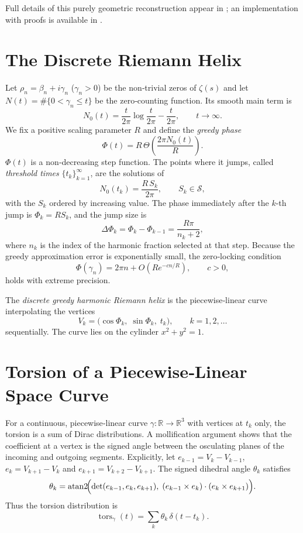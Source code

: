 \documentclass[11pt,a4paper]{article}
\newcommand{\R}{\mathbb{R}}
\newcommand{\tors}{\operatorname{tors}}
\newcommand{\atan}{\operatorname{atan2}}
\begin{document}
Full details of this purely geometric reconstruction appear in
\cite{geere2020}; an implementation with proofs is available in
\cite{geere2025sine}.

\section{The Discrete Riemann Helix}

Let \(\rho_n = \beta_n + i\gamma_n\) (\(\gamma_n>0\)) be the non‑trivial zeros
of \(\zeta(s)\) and let \(N(t) = \#\{0<\gamma_n\le t\}\) be the zero‑counting
function.  Its smooth main term is
\[
N_0(t) = \frac{t}{2\pi}\log\frac{t}{2\pi} - \frac{t}{2\pi}, \qquad t\to\infty.
\]
We fix a positive scaling parameter \(R\) and define the \emph{greedy phase}
\[
\Phi(t) = R \,\Theta\!\left( \frac{2\pi N_0(t)}{R} \right).
\]
\(\Phi(t)\) is a non‑decreasing step function.  The points where it jumps,
called \emph{threshold times} \(\{t_k\}_{k=1}^\infty\), are the solutions of
\[
N_0(t_k) = \frac{R\,S_k}{2\pi}, \qquad S_k \in \mathcal{S},
\]
with the \(S_k\) ordered by increasing value.  The phase immediately after
the \(k\)-th jump is \(\Phi_k = R S_k\), and the jump size is
\[
\Delta\Phi_k = \Phi_k - \Phi_{k-1} = \frac{R\pi}{n_k+2},
\]
where \(n_k\) is the index of the harmonic fraction selected at that
step.  Because the greedy approximation error is exponentially small,
the zero‑locking condition
\[
\Phi(\gamma_n) = 2\pi n + O(Re^{-c n/R}), \qquad c>0,
\]
holds with extreme precision.

The \emph{discrete greedy harmonic Riemann helix} is the piecewise‑linear
curve interpolating the vertices
\[
V_k = \bigl( \cos\Phi_k,\; \sin\Phi_k,\; t_k \bigr), \qquad k=1,2,\dots
\]
sequentially.  The curve lies on the cylinder \(x^2+y^2=1\).

\section{Torsion of a Piecewise‑Linear Space Curve}

For a continuous, piecewise‑linear curve \(\gamma:\R\to\R^3\) with vertices
at \(t_k\) only, the torsion is a sum of Dirac distributions.  A mollification
argument shows that the coefficient at a vertex is the signed angle between
the osculating planes of the incoming and outgoing segments.  Explicitly,
let \(e_{k-1}=V_k-V_{k-1}\), \(e_k=V_{k+1}-V_k\) and \(e_{k+1}=V_{k+2}-V_{k+1}\).
The signed dihedral angle \(\theta_k\) satisfies
\begin{equation}\label{eq:torsion-coeff}
\theta_k = \atan\!\Bigl( \det(e_{k-1},e_k,e_{k+1}),\;
(e_{k-1}\times e_k)\cdot(e_k\times e_{k+1}) \Bigr).
\end{equation}
Thus the torsion distribution is
\[
\tors_\gamma(t) = \sum_k \theta_k\,\delta(t-t_k).
\]
\end{document}
